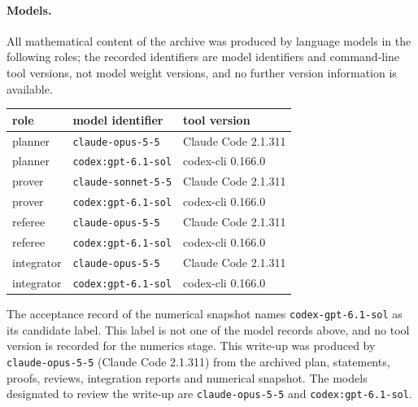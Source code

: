 \paragraph{Models.} All mathematical content of the archive was produced by language models in the following roles; the recorded identifiers are model identifiers and command-line tool versions, not model weight versions, and no further version information is available.
\begin{center}
\begin{tabular}{@{}lll@{}}
\toprule
role & model identifier & tool version\\
\midrule
planner & \texttt{claude-opus-5-5} & Claude Code 2.1.311\\
planner & \texttt{codex:gpt-6.1-sol} & codex-cli 0.166.0\\
prover & \texttt{claude-sonnet-5-5} & Claude Code 2.1.311\\
prover & \texttt{codex:gpt-6.1-sol} & codex-cli 0.166.0\\
referee & \texttt{claude-opus-5-5} & Claude Code 2.1.311\\
referee & \texttt{codex:gpt-6.1-sol} & codex-cli 0.166.0\\
integrator & \texttt{claude-opus-5-5} & Claude Code 2.1.311\\
integrator & \texttt{codex:gpt-6.1-sol} & codex-cli 0.166.0\\
\bottomrule
\end{tabular}
\end{center}
The acceptance record of the numerical snapshot names \texttt{codex-gpt-6.1-sol} as its candidate label. This label is not one of the model records above, and no tool version is recorded for the numerics stage. This write-up was produced by \texttt{claude-opus-5-5} (Claude Code 2.1.311) from the archived plan, statements, proofs, reviews, integration reports and numerical snapshot. The models designated to review the write-up are \texttt{claude-opus-5-5} and \texttt{codex:gpt-6.1-sol}.


